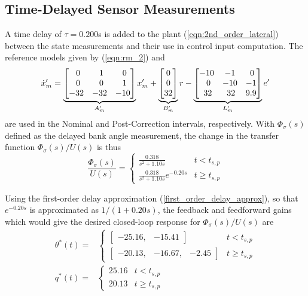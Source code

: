 \subsection{Time-Delayed Sensor Measurements}
A time delay of $\tau = 0.200$s is added to the plant (\ref{eqn:2nd_order_lateral}) between the state measurements and their use in control input computation. The reference models given by (\ref{eqn:rm_2}) and 
\begin{equation}
	\dot{x}_m' = \underbrace{\begin{bmatrix}
		\hfil 0 & \hfil 1 & \hfil 0\\ \hfil 0 & \hfil 0 & \hfil 1 \\ -32 & -32 & -10
	\end{bmatrix}}_{A_m'} x_m' + \underbrace{\begin{bmatrix}
		0 \\ 0 \\ 32
	\end{bmatrix}}_{B_m'} r - \underbrace{\begin{bmatrix}
		-10 & -1 & \hfil 0 \\ \hfil 0 & \hfil -10 & \hfil -1 \\ \hfil 32 & \hfil 32 & \hfil 9.9
	\end{bmatrix}}_{L_m'} e'
	\label{eqn:rm_3_delay}
\end{equation}
\noindent are used in the Nominal and Post-Correction intervals, respectively. With $\Phi_\sigma(s)$ defined as the delayed bank angle measurement, the change in the transfer function $\Phi_\sigma(s)/U(s)$ is thus
\begin{equation}
		\frac{\Phi_\sigma(s)}{U(s)} = \begin{cases}
			\frac{0.318}{s^2 + 1.10s} & t < t_{s,p}\\
			\frac{0.318}{s^2 + 1.10s}e^{-0.20 s} & t \geq t_{s,p}
		\end{cases} 
\end{equation}

Using the first-order delay approximation (\ref{first_order_delay_approx}), so that $e^{-0.20 s}$ is approximated as $1/(1+0.20s)$, the feedback and feedforward gains which would give the desired closed-loop response for $\Phi_\sigma(s)/U(s)$ are
\begin{align}
	\theta^*(t) = & \begin{cases} \begin{bmatrix} -25.16, & -15.41 \end{bmatrix} & t < t_{s,p} \\ \begin{bmatrix}-20.13, & -16.67, & -2.45\end{bmatrix} & t \geq t_{s,p} \end{cases} \\
	q^*(t) = &\begin{cases} 25.16 & t < t_{s,p} \\ 20.13 & t \geq t_{s,p} \end{cases}
\end{align}

